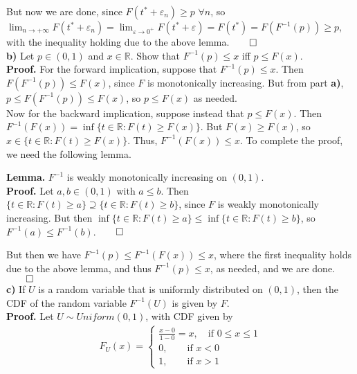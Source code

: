 \documentclass[11pt, letterpaper]{article}
\newcommand{\mbb}[1]{\mathbb{#1}}
\begin{document}
    But now we are done, since $F(t^\ast+\varepsilon_n)\geq p$ $\forall n$, so $\lim_{n\rightarrow+\infty}F(t^\ast+\varepsilon_n)=\lim_{\varepsilon\rightarrow 0^+}F(t^\ast+\varepsilon)=F(t^\ast)=F(F^{-1}(p))\geq p$,
    with the inequality holding due to the above lemma.\hfill{$\qed$}\\[10pt]
    {\bf b)} Let $p\in(0,1)$ and $x\in\mbb{R}$. Show that $F^{-1}(p)\leq x$ iff $p\leq F(x)$.\\[10pt]
    {\bf Proof.} For the forward implication, suppose that $F^{-1}(p)\leq x$. Then $F(F^{-1}(p))\leq F(x)$, since $F$ is monotonically increasing.
    But from part {\bf a)}, $p\leq F(F^{-1}(p))\leq F(x)$, so $p\leq F(x)$ as needed.\\[10pt]
    Now for the backward implication, suppose instead that $p\leq F(x)$. Then $F^{-1}(F(x))=\inf\{t\in\mbb{R}:F(t)\geq F(x)\}$. But $F(x)\geq F(x)$, so $x\in\{t\in\mbb{R}:F(t)\geq F(x)\}$. Thus,
    $F^{-1}(F(x))\leq x$. To complete the proof, we need the following lemma.\\[3pt]
    \begin{center}
        \begin{minipage}[c]{0.85\linewidth}
            {\bf Lemma.} $F^{-1}$ is weakly monotonically increasing on $(0,1)$.\\[10pt]
            {\bf Proof.} Let $a,b\in(0,1)$ with $a\leq b$. Then $\{t\in\mbb{R}:F(t)\geq a\}\supseteq\{t\in\mbb{R}:F(t)\geq b\}$, since $F$ is
            weakly monotonically increasing. But then $\inf\{t\in\mbb{R}:F(t)\geq a\}\leq\inf\{t\in\mbb{R}:F(t)\geq b\}$, so $F^{-1}(a)\leq F^{-1}(b)$.\hfill{$\qed$}
        \end{minipage}
    \end{center}\vspace{10pt}
    But then we have $F^{-1}(p)\leq F^{-1}(F(x))\leq x$, where the first inequality holds due to the above lemma, and thus $F^{-1}(p)\leq x$, as needed, and we are done.\hfill{$\qed$}\\[10pt]
    {\bf c)} If $U$ is a random variable that is uniformly distributed on $(0,1)$, then the CDF of the random variable $F^{-1}(U)$ is given by $F$.\\[10pt]
    {\bf Proof.} Let $U\sim Uniform(0,1)$, with CDF given by
    \begin{align*}
        F_U(x)=\begin{cases}
            \frac{x-0}{1-0}=x,\quad\text{if $0\leq x\leq1$}\\
            0,\qquad\text{if $x<0$}\\
            1,\qquad\text{if $x>1$}
        \end{cases}\tag{5.1}
    \end{align*}
\end{document}
